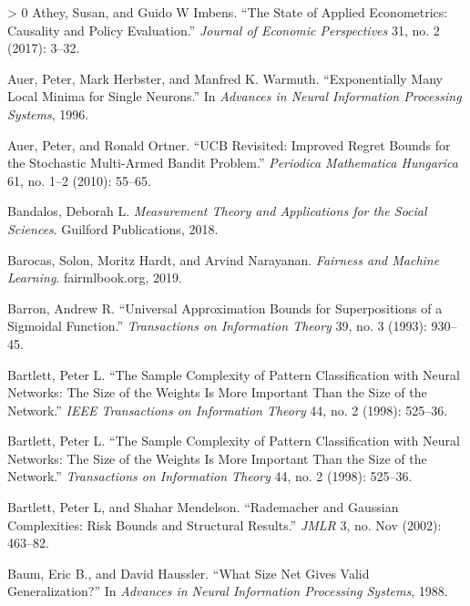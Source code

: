 \documentclass{tufte-book}
\newlength{\cslhangindent}
\newenvironment{CSLReferences}[3] %
 {%
  \setlength{\parindent}{0pt}
  \ifodd #1 \everypar{\setlength{\hangindent}{\cslhangindent}}\ignorespaces\fi
  \ifnum #2 > 0
  \setlength{\parskip}{#3\baselineskip}
  \fi
 }%
 {
 }
\begin{document}
\begin{CSLReferences}{1}{0}
\leavevmode\hypertarget{ref-athey2017state}{}%
Athey, Susan, and Guido W Imbens. {``The State of Applied Econometrics:
Causality and Policy Evaluation.''} \emph{Journal of Economic
Perspectives} 31, no. 2 (2017): 3--32.

\leavevmode\hypertarget{ref-auer1996exponentially}{}%
Auer, Peter, Mark Herbster, and Manfred K. Warmuth. {``Exponentially
Many Local Minima for Single Neurons.''} In \emph{Advances in Neural
Information Processing Systems}, 1996.

\leavevmode\hypertarget{ref-AuerOrtner10}{}%
Auer, Peter, and Ronald Ortner. {``{UCB} Revisited: Improved Regret
Bounds for the Stochastic Multi-Armed Bandit Problem.''} \emph{Periodica
Mathematica Hungarica} 61, no. 1--2 (2010): 55--65.

\leavevmode\hypertarget{ref-bandalos2018measurement}{}%
Bandalos, Deborah L. \emph{Measurement Theory and Applications for the
Social Sciences}. Guilford Publications, 2018.

\leavevmode\hypertarget{ref-barocas-hardt-narayanan}{}%
Barocas, Solon, Moritz Hardt, and Arvind Narayanan. \emph{Fairness and
Machine Learning}. fairmlbook.org, 2019.

\leavevmode\hypertarget{ref-Barron93}{}%
Barron, Andrew R. {``Universal Approximation Bounds for Superpositions
of a Sigmoidal Function.''} \emph{Transactions on Information Theory}
39, no. 3 (1993): 930--45.

\leavevmode\hypertarget{ref-bartlett1998sample}{}%
Bartlett, Peter L. {``The Sample Complexity of Pattern Classification
with Neural Networks: The Size of the Weights Is More Important Than the
Size of the Network.''} \emph{IEEE Transactions on Information Theory}
44, no. 2 (1998): 525--36.

\leavevmode\hypertarget{ref-bartlett98}{}%
Bartlett, Peter L. {``The Sample Complexity of Pattern Classification
with Neural Networks: The Size of the Weights Is More Important Than the
Size of the Network.''} \emph{Transactions on Information Theory} 44,
no. 2 (1998): 525--36.

\leavevmode\hypertarget{ref-bartlett2002rademacher}{}%
Bartlett, Peter L, and Shahar Mendelson. {``Rademacher and Gaussian
Complexities: Risk Bounds and Structural Results.''} \emph{JMLR} 3, no.
Nov (2002): 463--82.

\leavevmode\hypertarget{ref-Baum88}{}%
Baum, Eric B., and David Haussler. {``What Size Net Gives Valid
Generalization?''} In \emph{Advances in Neural Information Processing
Systems}, 1988.


\end{CSLReferences}
\end{document}
